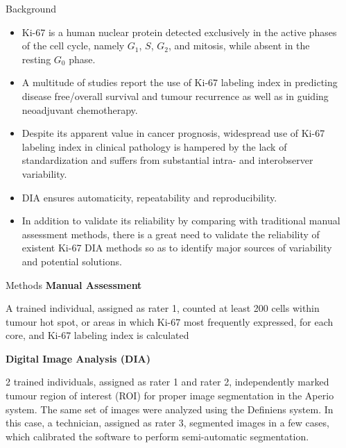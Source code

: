 \documentclass[final]{beamer}
\newlength{\onecolwid}
\begin{document}
\begin{frame}[t]
\begin{columns}[t]
\begin{column}{\onecolwid}
\begin{block}{Background}
\begin{itemize}
\item Ki-67 is a human nuclear protein detected exclusively in the active phases of the cell cycle, namely $G_1$, $S$, $G_2$, and mitosis, while absent in the resting $G_0$ phase.\cite{Gerdes1984}
\item A multitude of studies report the use of Ki-67 labeling index in predicting disease free/overall survival and tumour recurrence \cite{Stuart-Harris2005} as well as in guiding neoadjuvant chemotherapy. \cite{Jones2009}
\item Despite its apparent value in cancer prognosis, widespread use of Ki-67 labeling index in clinical pathology is hampered by the lack of standardization and suffers from substantial intra- and interobserver variability. \cite{Dowsett2011a, Polley2013a}
\item DIA ensures automaticity, repeatability and reproducibility.
\item In addition to validate its reliability by comparing with traditional manual assessment methods, there is a great need to validate the reliability of existent Ki-67 DIA methods so as to identify major sources of variability and potential solutions.
\end{itemize}
\end{block}


\begin{block}{Methods}
{\bf Manual Assessment}
\newline

A trained individual, assigned as rater 1, counted at least 200 cells within tumour hot spot, or areas in which Ki-67 most frequently expressed, for each core, and Ki-67 labeling index is calculated
\newline

{\bf Digital Image Analysis (DIA)}
\newline

2 trained individuals, assigned as rater 1 and rater 2, independently marked tumour region of interest (ROI) for proper image segmentation in the Aperio system. The same set of images were analyzed using the Definiens system. In this case, a technician, assigned as rater 3, segmented images in a few cases, which calibrated the software to perform semi-automatic segmentation.
\end{block}

\end{column} %
%
%
\begin{column}{\onecolwid} %
%


\end{column}
\end{columns}
\end{frame}
\end{document}
